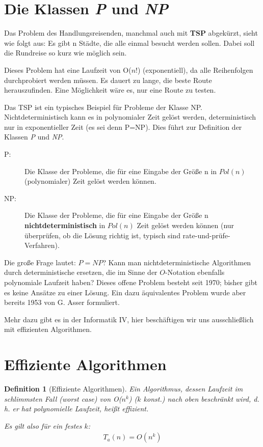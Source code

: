 \documentclass[ngerman,draft,parskip=half*,twoside]{scrreprt}
\theoremstyle{break}
\newtheorem{definition}{Definition}
\begin{document}
\section{Die Klassen \textit{P} und \textit{NP}}
Das Problem des Handlungsreisenden, manchmal auch mit \textbf{TSP} abgekürzt, sieht wie folgt aus:
Es gibt n Städte, die alle einmal besucht werden sollen. Dabei soll die
Rundreise so kurz wie möglich sein.

Dieses Problem hat eine Laufzeit von O($n!$) (exponentiell), da alle
Reihenfolgen durchprobiert werden müssen.  Es dauert zu lange, die beste
Route herauszufinden. Eine Möglichkeit wäre es, nur eine Route zu
testen.

Das TSP ist ein typisches Beispiel für Probleme der Klasse NP. 
Nichtdeterministisch kann es in polynomialer Zeit  gelöst werden, 
deterministisch nur in exponentieller Zeit (es sei denn P=NP). Dies führt zur Definition der Klassen \textit {P} und \textit {NP}.

\begin{description}
 \item[P:] Die Klasse der Probleme, die für eine Eingabe der Größe n in
  $Pol(n)$ (polynomialer) Zeit gelöst werden können.
 \item[NP:] Die Klasse der Probleme, die für eine Eingabe der Größe n
  \textbf{nichtdeterministisch} in $Pol(n)$ Zeit gelöst werden können 
  (nur überprüfen, ob die Lösung richtig ist, typisch sind
  rate-und-prüfe-Verfahren).
\end{description}

Die große Frage lautet: $P=NP$? Kann man nichtdeterministische Algorithmen durch deterministische ersetzen,
die im Sinne der $O$-Notation ebenfalls polynomiale Laufzeit haben?
Dieses offene Problem besteht seit 1970; bisher gibt es keine Ansätze zu einer Lösung. Ein
dazu äquivalentes Problem wurde aber bereits 1953 von G. Asser formuliert.

Mehr dazu gibt es in der Informatik IV, hier beschäftigen wir uns ausschließlich mit effizienten Algorithmen.

\section{Effiziente Algorithmen}

\begin{definition}[Effiziente Algorithmen]
  Ein Algorithmus, dessen Laufzeit im schlimmsten Fall (\emph{worst
  case}) von O($n^k$) ($k$ konst.) nach oben beschränkt wird, d.\,h. er hat
  \emph{polynomielle Laufzeit}, heißt effizient.
  
  Es gilt also für ein festes $k$:
  \begin{gather*}
    T_a (n)= O(n^k)     
  \end{gather*}
\end{definition}
\end{document}
